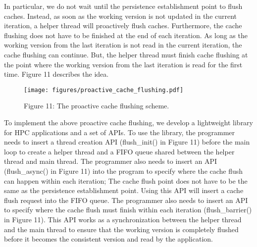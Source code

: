 In particular, we do not wait until the persistence establishment point to flush caches. Instead, as soon as the working version is not updated in the current iteration, a helper thread will
proactively flush caches. Furthermore, the cache flushing does not have to be finished at the end of each iteration. As long as the working version from the last iteration %
is not read in the current iteration, the cache flushing can continue. But, the helper thread must finish cache flushing
at the point where the working version 
from the last iteration is read for the first time.
Figure 11 describes the idea.


\begin{figure}
\centering
\texttt{[image: figures/proactive\_cache\_flushing.pdf]}
\vspace{-20pt}
\caption*{Figure 11: The proactive cache flushing scheme.}
\label{fig:proactive_cache_flushing}
\vspace{-20pt}
\end{figure}

\begin{comment}
\begin{figure}
\centering
\texttt{[image: figures/Dual\_clean.png]}
\caption*{Figure x: The proactive cache flushing scheme.}
\label{fig:proactive_cache_flushing}
\end{figure}
\end{comment}

To implement the above proactive cache flushing, we develop a lightweight library for HPC applications and a set of APIs. To use the library, the programmer needs to insert a thread creation API (flush\_init() in Figure 11) before the main loop to create a helper thread and a FIFO
queue shared between the helper thread and main thread.
The programmer also needs to insert an API (flush\_async() in Figure 11) into the program to specify where the cache flush can happen within each iteration; %
The cache flush point does not have to be the same as the persistence establishment point. 
Using this API will insert a cache flush request into the FIFO queue.
The programmer also needs to insert an API to specify where the cache flush must finish within each iteration (flush\_barrier() in Figure 11). This API works as a synchronization between the helper thread and the main thread to ensure that the working version is completely flushed before it becomes the consistent version and read by the application.

